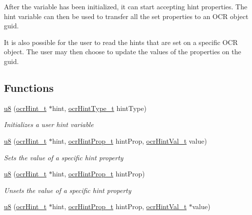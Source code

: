 After the variable has been initialized, it can start accepting hint properties.
The hint variable can then be used to transfer all the set properties to an OCR
object guid.

It is also possible for the user to read the hints that are set on a specific
OCR object. The user may then choose to update the values of the properties on
the guid.


\subsection*{Functions}
\begin{DoxyCompactItemize}
\item
  \hyperlink{type_u8}{u8} \hyperlink{func_ocrHintInit}
            {}(\hyperlink{type_ocrHint_t}{ocr\-Hint\-\_\-t} $\ast$hint,
      \hyperlink{type_ocrHintType_t}{ocrHintType\_t} hintType)
    \begin{DoxyCompactList}
      \small\item \emph{Initializes a user hint variable}
    \end{DoxyCompactList}
\item
  \hyperlink{type_u8}{u8} \hyperlink{func_ocrHintSetValue}
            {}(\hyperlink{type_ocrHint_t}{ocr\-Hint\-\_\-t} $\ast$hint,
      \hyperlink{type_ocrHintProp_t}{ocrHintProp\_t} hintProp, \hyperlink{type_ocrHintVal_t}{ocr\-Hint\-Val\-\_\-t} value)
    \begin{DoxyCompactList}
      \small\item \emph{Sets the value of a specific hint property}
    \end{DoxyCompactList}
\item
  \hyperlink{type_u8}{u8} \hyperlink{func_ocrHintUnsetValue}
            {}(\hyperlink{type_ocrHint_t}{ocr\-Hint\-\_\-t} $\ast$hint,
      \hyperlink{type_ocrHintProp_t}{ocrHintProp\_t} hintProp)
    \begin{DoxyCompactList}
      \small\item \emph{Unsets the value of a specific hint property}
    \end{DoxyCompactList}
\item
  \hyperlink{type_u8}{u8} \hyperlink{func_ocrHintGetValue}
            {}(\hyperlink{type_ocrHint_t}{ocr\-Hint\-\_\-t} $\ast$hint,
      \hyperlink{type_ocrHintProp_t}{ocrHintProp\_t} hintProp, \hyperlink{type_ocrHintVal_t}{ocr\-Hint\-Val\-\_\-t} $\ast$value)
    \begin{DoxyCompactList}

\end{DoxyCompactList}
\end{DoxyCompactItemize}
